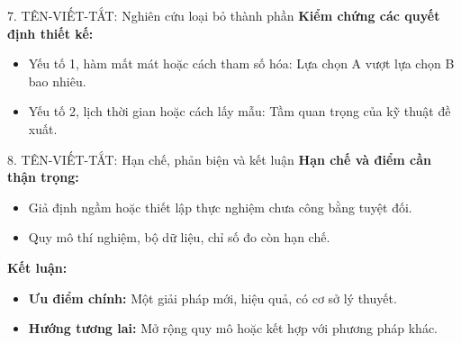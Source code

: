 \begin{frame}{7. TÊN-VIẾT-TẮT: Nghiên cứu loại bỏ thành phần}
    \textbf{Kiểm chứng các quyết định thiết kế:}
    \begin{itemize}
        \item Yếu tố 1, hàm mất mát hoặc cách tham số hóa: Lựa chọn A vượt lựa chọn B bao nhiêu.
        \item Yếu tố 2, lịch thời gian hoặc cách lấy mẫu: Tầm quan trọng của kỹ thuật đề xuất.
    \end{itemize}
\end{frame}

\begin{frame}{8. TÊN-VIẾT-TẮT: Hạn chế, phản biện và kết luận}
    \textbf{Hạn chế và điểm cần thận trọng:}
    \begin{itemize}
        \item Giả định ngầm hoặc thiết lập thực nghiệm chưa công bằng tuyệt đối.
        \item Quy mô thí nghiệm, bộ dữ liệu, chỉ số đo còn hạn chế.
    \end{itemize}
    \vspace{0.2cm}
    \textbf{Kết luận:}
    \begin{itemize}
        \item \textbf{Ưu điểm chính:} Một giải pháp mới, hiệu quả, có cơ sở lý thuyết.
        \item \textbf{Hướng tương lai:} Mở rộng quy mô hoặc kết hợp với phương pháp khác.
    \end{itemize}
\end{frame}
